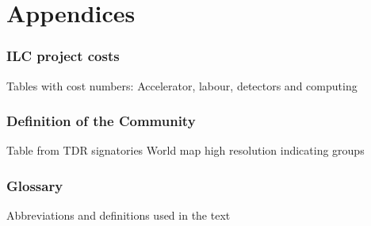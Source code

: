 \documentclass[%
 reprint,
 amsmath,amssymb,
 aps,
]{revtex4-1}
\begin{document}
\appendix
\part*{Appendices}

\section{\label{Appendix1}ILC project costs} 
Tables with cost numbers: Accelerator, labour, detectors and computing

\section{\label{Appendix2}Definition of the Community} 

Table from TDR signatories
World map high resolution indicating groups

\section{\label{Appendix3} Glossary} 
Abbreviations and definitions used in the text

%

\end{document}
